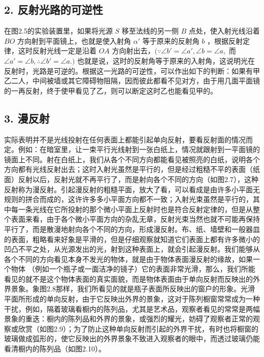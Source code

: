 \subsection{2.
反射光路的可逆性}

在图2.5的实验装置里，如果将光源 \(S\) 移至法线的另一侧 \(B\)
点处，使入射光线沿着 \(BO\) 方向射到平面镜上，也就是使入射角 \(\alpha'\)
等于原来的反射角 \(b\) ，根据反射定律，这时反射光线一定是沿着 \(OA\)
方向射出去，\((\because \angle b' = \angle a', \angle b = \angle a,\) 而
\(\angle a' = \angle b, \therefore \angle b' = \angle a.)\)
也就是说，这时的反射角等于原来的入射角，这说明光在反射时，光路是可逆的。根据这一光路的可逆性，可以作出如下的判断：如果有甲乙二人，中间被墙或其它障碍物阻隔，因而彼此都看不见对方，由于用几面平面镜的一再反射，终于使甲看见了乙，则可以断定这时乙也能看见甲的。

\subsection{3. 漫反射}

实际表明并不是光线投射在任何表面上都能引起单向反射，要看反射面的情况而定。例如：在暗室里，让一束平行光线射到一张白纸上，情况就跟射到一平面镜的镜面上不同。射在白纸上，我们从各个不同方向都能看见被照亮的白纸，说明各个方向都有光线反射出去；这时入射光虽然是平行的，但是经过粗糙不平的表面（纸面）反射以后，反射光就不再平行了，而是射向各个不同的方向（如图2.7），这种反射称为漫反射。引起漫反射的粗糙平面，放大了看，可以看成是由许多小平面无规则的拼合而成的，这许许多多小平面方向都不一致；入射光束虽然是平行的，其中每一条光线在它所投射的那个微小平面上反射时也是符合反射定律的，但是从整个表面来看，由于各个微小平面方向的杂乱无章，反射光束当然也就不可能再保持平行了，而是散漫地射向各个不同的方向，形成漫反射。布、纸、墙壁和一般器皿的表面，粗略看来好象是平滑的，但是仔细观察就知道它们表面上都有许多微小的凹凸不平之处，从光源发出的光，射到这种表面上，就会引起漫反射。我们能够从各个不同的方向看见本身不发光的物体，就是由于物体表面漫反射的缘故，如果一个物体
（例如一个瓶子或一面洁净的镜子）它的表面非常光滑，那么，我们所能看见的就不是这个物体表面的真实面貌，而是物体表面由于单向反射而反映出的外界景象。象图2.8那样，我们所看见的就是瓶子表面所反映出的窗户的形象。光滑平面所形成的单向反射，由于它反映出外界的景象，这对于陈列橱窗常常成为一种干扰，例如，隔着玻璃看橱内的陈列品，尤其是艺术品，观察者看见的常常是两幅景象的重迭：橱内的陈列品和外界的景象，或强烈的耀光，妨碍了观察者正常的观察或欣赏（如图2.9）；为了防止这种单向反射而引起的外界干扰，有时也将橱窗的玻璃做成弧形的，使它反映出的外界景象不致进入观察者的眼中，而透过玻璃仍能看清橱内的陈列品（如图2.10）。

